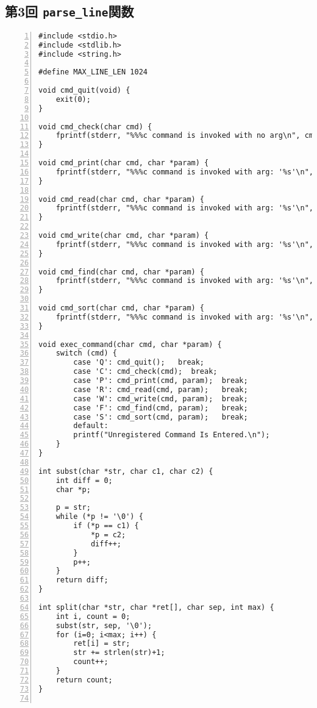 \documentclass[autodetect-engine,dvi=dvipdfmx,ja=standard,
               a4j,11pt]{bxjsarticle}
\begin{document}
\subsection{第3回 \texttt{parse\_line}関数} \label{code:3}

\begin{Verbatim}[numbers=left, xleftmargin=10mm, numbersep=6pt,
    fontsize=\small, baselinestretch=0.8]
#include <stdio.h>
#include <stdlib.h>
#include <string.h>

#define MAX_LINE_LEN 1024

void cmd_quit(void) {
    exit(0);
}

void cmd_check(char cmd) {
    fprintf(stderr, "%%%c command is invoked with no arg\n", cmd);
}

void cmd_print(char cmd, char *param) {
    fprintf(stderr, "%%%c command is invoked with arg: '%s'\n", cmd, param);
}

void cmd_read(char cmd, char *param) {
    fprintf(stderr, "%%%c command is invoked with arg: '%s'\n", cmd, param);
}

void cmd_write(char cmd, char *param) {
    fprintf(stderr, "%%%c command is invoked with arg: '%s'\n", cmd, param);
}

void cmd_find(char cmd, char *param) {
    fprintf(stderr, "%%%c command is invoked with arg: '%s'\n", cmd, param);
}

void cmd_sort(char cmd, char *param) {
    fprintf(stderr, "%%%c command is invoked with arg: '%s'\n", cmd, param);
}

void exec_command(char cmd, char *param) {
    switch (cmd) {
        case 'Q': cmd_quit();   break;
        case 'C': cmd_check(cmd);  break;
        case 'P': cmd_print(cmd, param);  break;
        case 'R': cmd_read(cmd, param);   break;
        case 'W': cmd_write(cmd, param);  break;
        case 'F': cmd_find(cmd, param);   break;
        case 'S': cmd_sort(cmd, param);   break;
        default:
        printf("Unregistered Command Is Entered.\n");
    }
}

int subst(char *str, char c1, char c2) {
    int diff = 0;
    char *p;

    p = str;
    while (*p != '\0') {
        if (*p == c1) {
            *p = c2;
            diff++;
        }
        p++;
    }
    return diff;
}

int split(char *str, char *ret[], char sep, int max) {
    int i, count = 0;
    subst(str, sep, '\0');
    for (i=0; i<max; i++) {
        ret[i] = str;
        str += strlen(str)+1;
        count++;
    }
    return count;
}


\end{Verbatim}
\end{document}
